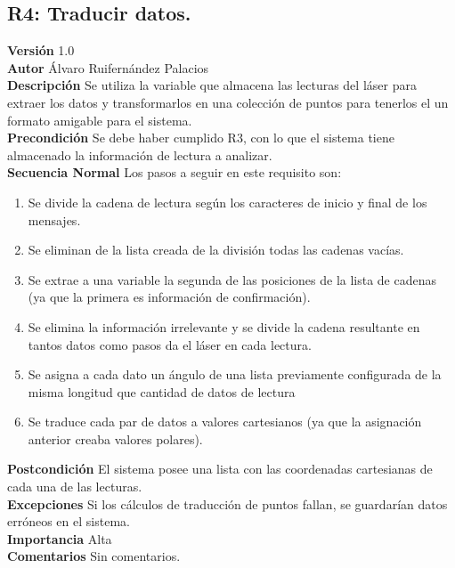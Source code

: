 \subsection{R4: Traducir datos.}
\textbf{Versión} 1.0\\
\textbf{Autor} Álvaro Ruifernández Palacios\\
\textbf{Descripción} Se utiliza la variable que almacena las lecturas del láser para extraer los datos y transformarlos en una colección de puntos para tenerlos el un formato amigable para el sistema.\\
\textbf{Precondición} Se debe haber cumplido R3, con lo que el sistema tiene almacenado la información de lectura a analizar.\\
\textbf{Secuencia Normal} Los pasos a seguir en este requisito son:
\begin{enumerate}
	\item Se divide la cadena de lectura según los caracteres de inicio y final de los mensajes.
	\item Se eliminan de la lista creada de la división todas las cadenas vacías.
	\item Se extrae a una variable la segunda de las posiciones de la lista de cadenas (ya que la primera es información de confirmación).
	\item Se elimina la información irrelevante y se divide la cadena resultante en tantos datos como pasos da el láser en cada lectura.
	\item Se asigna a cada dato un ángulo de una lista previamente configurada de la misma longitud que cantidad de datos de lectura
	\item Se traduce cada par de datos a valores cartesianos (ya que la asignación anterior creaba valores polares).
\end{enumerate}
\textbf{Postcondición} El sistema posee una lista con las coordenadas cartesianas de cada una de las lecturas.\\
\textbf{Excepciones} Si los cálculos de traducción de puntos fallan, se guardarían datos erróneos en el sistema.\\
\textbf{Importancia} Alta\\
\textbf{Comentarios} Sin comentarios.\\

